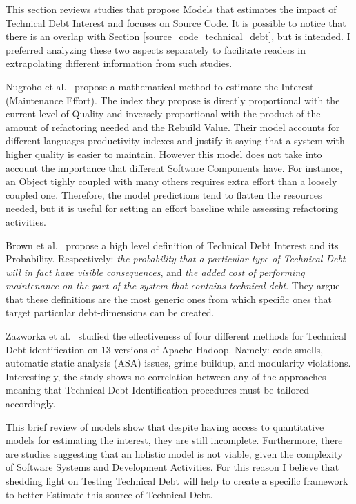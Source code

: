 This section reviews studies that propose Models that estimates the impact of Technical Debt Interest and focuses on Source Code. It is possible to notice that there is an overlap with Section \ref{source_code_technical_debt}, but is intended. I preferred analyzing these two aspects separately to facilitate readers in extrapolating different information from such studies.

Nugroho et al.\ \cite{technicalDebtInterest} propose a mathematical method to estimate the Interest (Maintenance Effort). The index they propose is directly proportional with the current level of Quality and inversely proportional with the product of the amount of refactoring needed and the Rebuild Value. Their model accounts for different languages productivity indexes and justify it saying that a system with higher quality is easier to maintain. However this model does not take into account the importance that different Software Components have. For instance, an Object tighly coupled with many others requires extra effort than a loosely coupled one. Therefore, the model predictions tend to flatten the resources needed, but it is useful for setting an effort baseline while assessing refactoring activities.

Brown et al.\ \cite{td_current_vs_optimal_quality} propose a high level definition of Technical Debt Interest and its Probability. Respectively: \textit{the probability that a particular type of Technical Debt will in fact have visible consequences}, and \textit{the added cost of performing maintenance on the part of the system that contains technical debt}. They argue that these definitions are the most generic ones from which specific ones that target particular debt-dimensions can be created.

Zazworka et al.\ \cite{4_methods_to_identify_td} studied the effectiveness of four different methods for Technical Debt identification on 13 versions of Apache Hadoop. Namely: code smells, automatic static analysis (ASA) issues, grime
buildup, and modularity violations. Interestingly, the study shows no correlation between any of the approaches meaning that Technical Debt Identification procedures must be tailored accordingly.

This brief review of models show that despite having access to quantitative models for estimating the interest, they are still incomplete. Furthermore, there are studies suggesting that an holistic model is not viable, given the complexity of Software Systems and Development Activities. For this reason I believe that shedding light on Testing Technical Debt will help to create a specific framework to better Estimate this source of Technical Debt.
